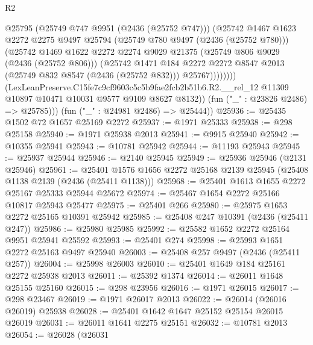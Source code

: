 \begin{lexlean}{R2}
\begin{coremodule}
                      @25795
                      (@25749 @747 @9951 (@2436 (@25752 @747)))
                      (@25742
                        @1467
                        @1623
                        @2272
                        @2275
                        @9497
                        @25794
                        (@25749 @780 @9497 (@2436 (@25752 @780)))
                        (@25742
                          @1469
                          @1622
                          @2272
                          @2274
                          @9029
                          @21375
                          (@25749 @806 @9029 (@2436 (@25752 @806)))
                          (@25742
                            @1471
                            @184
                            @2272
                            @2272
                            @8547
                            @2013
                            (@25749 @832 @8547 (@2436 (@25752 @832)))
                            @25767))))))))
            (LexLeanPreserve.C15fe7c9cf9603c5c5b9fae2fcb2b51b6.R2.__rel_12
              @11309
              @10897
              @10471
              @10031
              @9577
              @9109
              @8627
              @8132))
          (fun ("_" : @23826 @2486) => @25785)))
      (fun ("_" : @24981 @2486) => @25444))
@25936 := @25435 @1502 @72 @1657 @25169 @2272
@25937 := @1971 @25333
@25938 := @298 @25158
@25940 := @1971 @25938 @2013
@25941 := @9915 @25940
@25942 := @10355 @25941
@25943 := @10781 @25942
@25944 := @11193 @25943
@25945 := @25937 @25944
@25946 := @2140 @25945
@25949 := @25936 @25946 (@2131 @25946)
@25961 := @25401 @1576 @1656 @2272 @25168 @2139 @25945 (@25408 @1138 @2139 (@2436 (@25411 @1138)))
@25968 := @25401 @1613 @1655 @2272 @25167 @25333 @25944 @25672
@25974 := @25467 @1654 @2272 @25166 @10817 @25943 @25477
@25975 := @25401 @266
@25980 := @25975 @1653 @2272 @25165 @10391 @25942
@25985 := @25408 @247 @10391 (@2436 (@25411 @247))
@25986 := @25980 @25985
@25992 := @25582 @1652 @2272 @25164 @9951 @25941 @25592
@25993 := @25401 @274
@25998 := @25993 @1651 @2272 @25163 @9497 @25940
@26003 := @25408 @257 @9497 (@2436 (@25411 @257))
@26004 := @25998 @26003
@26010 := @25401 @1649 @184 @25161 @2272 @25938 @2013
@26011 := @25392 @1374
@26014 := @26011 @1648 @25155 @25160
@26015 := @298 @23956
@26016 := @1971 @26015
@26017 := @298 @23467
@26019 := @1971 @26017 @2013
@26022 := @26014 (@26016 @26019) @25938
@26028 := @25401 @1642 @1647 @25152 @25154 @26015 @26019
@26031 := @26011 @1641 @2275 @25151
@26032 := @10781 @2013
@26054 := @26028
    (@26031

\end{coremodule}
\end{lexlean}

